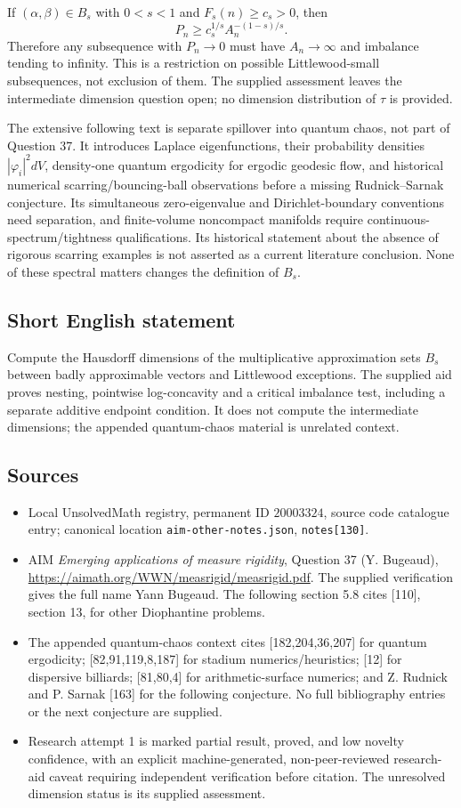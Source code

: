 \documentclass[11pt]{article}
\begin{document}
If $(\alpha,\beta)\in B_s$ with $0<s<1$ and $F_s(n)\geq c_s>0$, then
\[
 P_n\geq c_s^{1/s}A_n^{-(1-s)/s}.
\]
Therefore any subsequence with $P_n\to0$ must have $A_n\to\infty$ and imbalance tending to infinity. This is a restriction on possible Littlewood-small subsequences, not exclusion of them. The supplied assessment leaves the intermediate dimension question open; no dimension distribution of $\tau$ is provided.

The extensive following text is separate spillover into quantum chaos, not part of Question 37. It introduces Laplace eigenfunctions, their probability densities $|\varphi_i|^2dV$, density-one quantum ergodicity for ergodic geodesic flow, and historical numerical scarring/bouncing-ball observations before a missing Rudnick--Sarnak conjecture. Its simultaneous zero-eigenvalue and Dirichlet-boundary conventions need separation, and finite-volume noncompact manifolds require continuous-spectrum/tightness qualifications. Its historical statement about the absence of rigorous scarring examples is not asserted as a current literature conclusion. None of these spectral matters changes the definition of $B_s$.
\subsection{Short English statement}
Compute the Hausdorff dimensions of the multiplicative approximation sets $B_s$ between badly approximable vectors and Littlewood exceptions. The supplied aid proves nesting, pointwise log-concavity and a critical imbalance test, including a separate additive endpoint condition. It does not compute the intermediate dimensions; the appended quantum-chaos material is unrelated context.
\subsection{Sources}
\begin{itemize}
\item Local UnsolvedMath registry, permanent ID $20003324$, source code catalogue entry; canonical location \texttt{aim-other-notes.json}, \texttt{notes[130]}.
\item AIM \emph{Emerging applications of measure rigidity}, Question 37 (Y. Bugeaud), \url{https://aimath.org/WWN/measrigid/measrigid.pdf}. The supplied verification gives the full name Yann Bugeaud. The following section 5.8 cites [110], section 13, for other Diophantine problems.
\item The appended quantum-chaos context cites [182,204,36,207] for quantum ergodicity; [82,91,119,8,187] for stadium numerics/heuristics; [12] for dispersive billiards; [81,80,4] for arithmetic-surface numerics; and Z. Rudnick and P. Sarnak [163] for the following conjecture. No full bibliography entries or the next conjecture are supplied.
\item Research attempt 1 is marked partial result, proved, and low novelty confidence, with an explicit machine-generated, non-peer-reviewed research-aid caveat requiring independent verification before citation. The unresolved dimension status is its supplied assessment.
\end{itemize}
\end{document}
